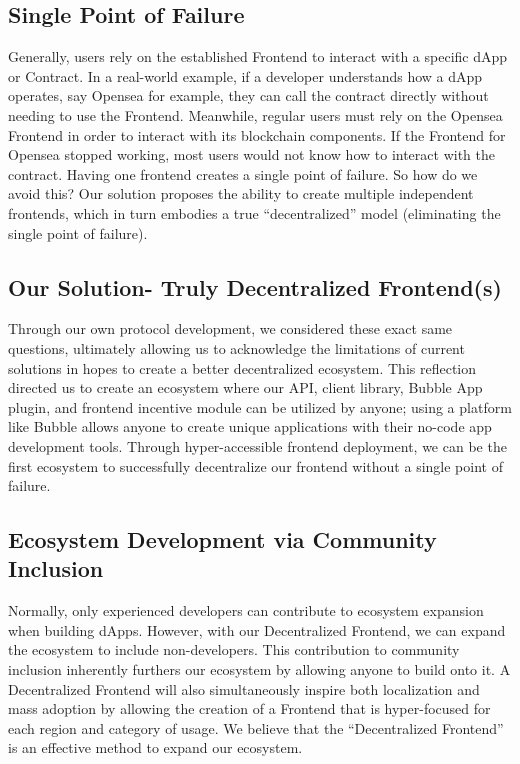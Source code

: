 \documentclass[dvipdfmx]{jsarticle}
\begin{document}
\subsection{Single Point of Failure}
Generally, users rely on the established Frontend to interact with a specific dApp or Contract. 
In a real-world example, if a developer understands how a dApp operates, say Opensea for example, they can call the contract directly without needing to use the Frontend. 
Meanwhile, regular users must rely on the Opensea Frontend in order to interact with its blockchain components. 
If the Frontend for Opensea stopped working, most users would not know how to interact with the contract. 
Having one frontend creates a single point of failure. 
So how do we avoid this? Our solution proposes the ability to create multiple independent frontends, which in turn embodies a true “decentralized” model (eliminating the single point of failure).

\subsection{Our Solution- Truly Decentralized Frontend(s)}
Through our own protocol development, we considered these exact same questions, ultimately allowing us to acknowledge the limitations of current solutions in hopes to create a better decentralized ecosystem.
This reflection directed us to create an ecosystem where our API, client library, Bubble App plugin, and frontend incentive module can be utilized by anyone; using a platform like Bubble allows anyone to create unique applications with their no-code app development tools. 
Through hyper-accessible frontend deployment, we can be the first ecosystem to successfully decentralize our frontend without a single point of failure.

\subsection{Ecosystem Development via Community Inclusion}
Normally, only experienced developers can contribute to ecosystem expansion when building dApps. 
However, with our Decentralized Frontend, we can expand the ecosystem to include non-developers. 
This contribution to community inclusion inherently furthers our ecosystem by allowing anyone to build onto it. 
A Decentralized Frontend will also simultaneously inspire both localization and mass adoption by allowing the creation of a Frontend that is hyper-focused for each region and category of usage.
We believe that the “Decentralized Frontend” is an effective method to expand our ecosystem. 
\end{document}
